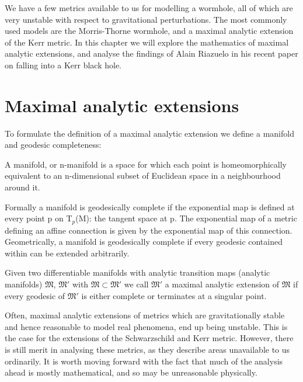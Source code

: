 \documentclass[oneside,openright,frontopenright, singlespacing]{dmathesis}
\begin{document}
	We have a few metrics available to us for modelling a wormhole, all of which are very unstable with respect to gravitational perturbations. The most commonly used models are the Morris-Thorne wormhole, and a maximal analytic extension of the Kerr metric. In this chapter we will explore the mathematics of maximal analytic extensions, and analyse the findings of Alain Riazuelo in his recent paper on falling into a Kerr black hole\cite{seeingRelativity}.

\section{Maximal analytic extensions}\label{sec:Section6.1}

	To formulate the definition of a maximal analytic extension we define a manifold and geodesic completeness:

\vspace{1em}
	A manifold, or n-manifold is a space for which each point is homeomorphically equivalent to an n-dimensional subset of Euclidean space in a neighbourhood around it.

\vspace{1em}
	Formally a manifold is geodesically complete if the exponential map is defined at every point p on T$_p$(M): the tangent space at p. The exponential map of a metric defining an affine connection is given by the exponential map of this connection. Geometrically, a manifold is geodesically complete if every geodesic contained within can be extended arbitrarily.

\vspace{1em}
	Given two differentiable manifolds with analytic transition maps (analytic manifolds) $\mathfrak{M}$, $\mathfrak{M}'$ with $\mathfrak{M} \subset \mathfrak{M}'$ we call $\mathfrak{M}'$ a maximal analytic extension of $\mathfrak{M}$ if every geodesic of $\mathfrak{M}'$ is either complete or terminates at a singular point.

\vspace{1em}
	Often, maximal analytic extensions of metrics which are gravitationally stable and hence reasonable to model real phenomena, end up being unstable. This is the case for the extensions of the Schwarzschild and Kerr metric. However, there is still merit in analysing these metrics, as they describe areas unavailable to us ordinarily. It is worth moving forward with the fact that much of the analysis ahead is mostly mathematical, and so may be unreasonable physically.
\end{document}

